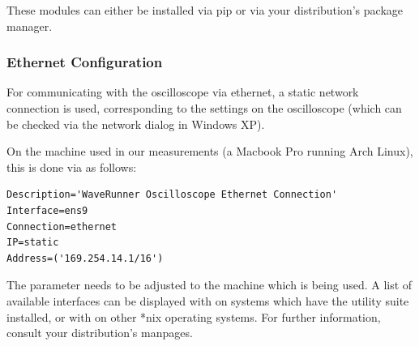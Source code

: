 These  modules can  either be  installed via  pip or  via your  distribution's
package manager.


\subsubsection{Ethernet Configuration}
\label{subsubsec:laptop:netconf}

For  communicating  with  the  oscilloscope via  ethernet,  a  static  network
connection is used,  corresponding to the settings on  the oscilloscope (which
can be checked via the network dialog in Windows XP).

On the  machine used in our  measurements (a Macbook Pro  running Arch Linux),
this is done via  as follows\footnotemark:

\begin{verbatim}
Description='WaveRunner Oscilloscope Ethernet Connection'
Interface=ens9                                                                                                                                                                                            
Connection=ethernet                                                                                                                                                                                       
IP=static                                                                                                                                                                                                 
Address=('169.254.14.1/16')                                                                                                                                                                               
\end{verbatim}


The   parameter  needs to  be  adjusted to  the machine  which
is  being  used. A  list  of   available  interfaces  can  be  displayed  with
  on  systems  which have  the    utility  suite
\cite{ref:iproute2}  installed,  or with    \cite{ref:ifconfig}
on  other  *nix  operating  systems. For  further  information,  consult  your
distribution's manpages.


